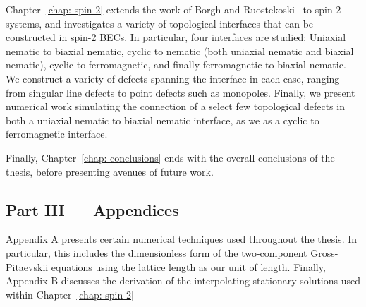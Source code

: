 Chapter~\ref{chap: spin-2} extends the work of Borgh and
Ruostekoski~\cite{Borgh2012, Borgh2013, Borgh2014} to spin-2 systems, and
investigates a variety of topological interfaces that can be constructed in
spin-2 BECs.
In particular, four interfaces are studied: Uniaxial nematic to biaxial nematic,
cyclic to nematic (both uniaxial nematic and biaxial nematic), cyclic to
ferromagnetic, and finally ferromagnetic to biaxial nematic.
We construct a variety of defects spanning the interface in each case, ranging
from singular line defects to point defects such as monopoles.
Finally, we present numerical work simulating the connection of a select few
topological defects in both a uniaxial nematic to biaxial nematic interface, as
we as a cyclic to ferromagnetic interface.

Finally, Chapter~\ref{chap: conclusions} ends with the overall conclusions of
the thesis, before presenting avenues of future work.

\subsection*{Part III --- Appendices}
Appendix A presents certain numerical techniques used throughout the thesis.
In particular, this includes the dimensionless form of the two-component
Gross-Pitaevskii equations using the lattice length as our unit of length.
Finally, Appendix B discusses the derivation of the interpolating stationary
solutions used within Chapter~\ref{chap: spin-2}
